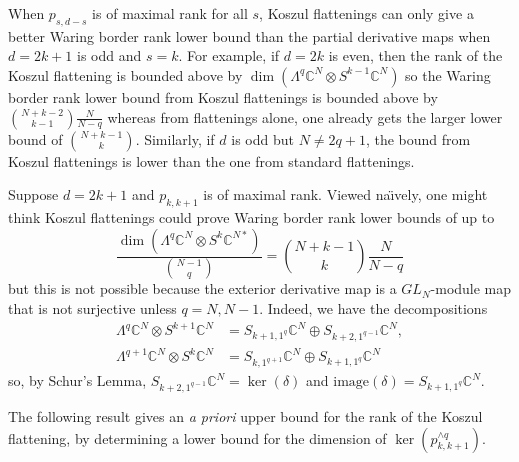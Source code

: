 \documentclass[11pt]{article}
\numberwithin{equation}{section}
\theoremstyle{definition}
\theoremstyle{plain}
\newcommand{\bbC}{\mathbb{C}}
\def\BC{\mathbb C}
\def\tdim{\operatorname{dim}}
\def\tim{\mathrm{image}}
\def\tker{\operatorname{ker}}
\begin{document}
When $p_{s,d-s}$ is of maximal rank for all $s$, Koszul flattenings can only give a better Waring border rank lower bound than the partial derivative maps when $d=2k+1$ is odd and $s=k$. For example, if $d=2k$ is even, then the rank of the Koszul flattening is bounded above by $\dim \left( \Lambda^q \bbC^N  \otimes S^{k-1}\bbC^N \right)$ so the   Waring border rank lower bound from Koszul flattenings is bounded above by $\binom{N+k-2}{k-1}\frac N{N-q}$ whereas from flattenings alone, one already gets the larger lower bound of $\binom{N+k-1}{k}$. Similarly, if $d$ is odd but $N \neq 2q+1$, the bound from Koszul flattenings is lower than the one from standard flattenings. 

Suppose $d=2k+1$ and  $p_{k,k+1}$ is of maximal rank. Viewed na\"\i vely, one might think Koszul flattenings could prove Waring border rank lower bounds of up to
$$
\frac{\tdim ( \Lambda^q \BC^N \otimes S^k\BC^{N*})}{\binom{N-1}{q}}=\binom{N+k-1}k \frac N{N-q}
$$
but this is not possible because the exterior derivative map is a $GL_N$-module map  that is not surjective unless $q = N,N-1$. Indeed, we have
the decompositions
\begin{align*} 
\Lambda^q \BC^N \otimes S^{k+1} \BC^N &= S_{k+1,1^q}\BC^N\oplus S_{k+2,1^{q-1}}\BC^N, \\
\Lambda^{q+1} \BC^N\otimes S^{k } \BC^N &= S_{k ,1^{q+1}}\BC^N\oplus S_{k+1,1^{q }}\BC^N
\end{align*}
so, by Schur's Lemma, $S_{k+2,1^{q-1}}\BC^N =  \tker (\delta)$ and   $\tim (\delta) = S_{k+1,1^{q }}\BC^N$.
 
The following result gives an \emph{a priori} upper bound for the rank of the Koszul flattening, by determining a lower bound for the dimension of $\ker(p_{k,k+1}^{\wedge q})$.
\end{document}
